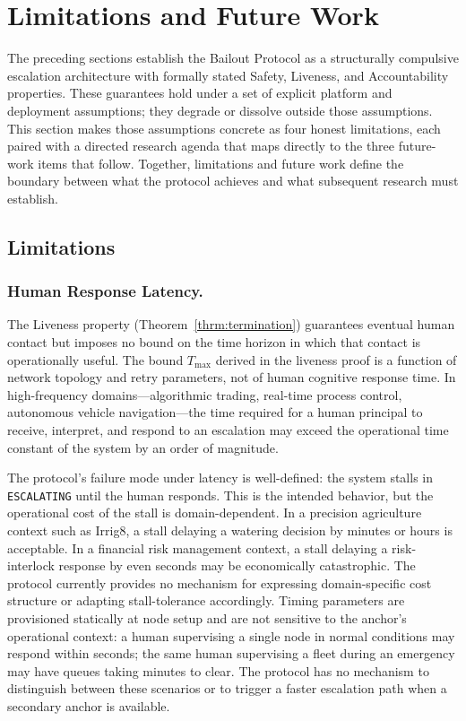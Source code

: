 \section{Limitations and Future Work}
\label{sec:limitations}

The preceding sections establish the Bailout Protocol as a structurally compulsive escalation architecture with formally stated Safety, Liveness, and Accountability properties. These guarantees hold under a set of explicit platform and deployment assumptions; they degrade or dissolve outside those assumptions. This section makes those assumptions concrete as four honest limitations, each paired with a directed research agenda that maps directly to the three future-work items that follow. Together, limitations and future work define the boundary between what the protocol achieves and what subsequent research must establish.

\subsection{Limitations}

\subsubsection{Human Response Latency.}
\label{sec:limitations-latency}

The Liveness property (Theorem~\ref{thrm:termination}) guarantees eventual human contact but imposes no bound on the time horizon in which that contact is operationally useful. The bound $T_{\max}$ derived in the liveness proof is a function of network topology and retry parameters, not of human cognitive response time. In high-frequency domains---algorithmic trading, real-time process control, autonomous vehicle navigation---the time required for a human principal to receive, interpret, and respond to an escalation may exceed the operational time constant of the system by an order of magnitude.

The protocol's failure mode under latency is well-defined: the system stalls in \texttt{ESCALATING} until the human responds. This is the intended behavior, but the operational cost of the stall is domain-dependent. In a precision agriculture context such as Irrig8, a stall delaying a watering decision by minutes or hours is acceptable. In a financial risk management context, a stall delaying a risk-interlock response by even seconds may be economically catastrophic. The protocol currently provides no mechanism for expressing domain-specific cost structure or adapting stall-tolerance accordingly. Timing parameters are provisioned statically at node setup and are not sensitive to the anchor's operational context: a human supervising a single node in normal conditions may respond within seconds; the same human supervising a fleet during an emergency may have queues taking minutes to clear. The protocol has no mechanism to distinguish between these scenarios or to trigger a faster escalation path when a secondary anchor is available.

